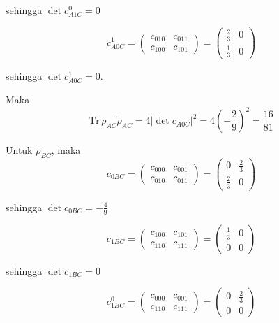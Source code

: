 \begin{enumerate}
	sehingga $\det c_{A1C}^0 = 0$
	
	\begin{equation}
		c_{A0C}^1=
		\begin{pmatrix}
			c_{010} & c_{011} \\
			c_{100} & c_{101}
		\end{pmatrix}=
		\begin{pmatrix}
			\frac{2}{3} & 0 \\
			\frac{1}{3} & 0
		\end{pmatrix}
	\end{equation}
	
	sehingga $\det c_{A0C}^1 = 0$.
	
	Maka
	\begin{equation}
		\mathrm{Tr}\,\rho_{AC}\tilde{\rho}_{AC}=4|\det c_{A0C}|^2=4(-\frac{2}{9})^2=\frac{16}{81}
	\end{equation}
	
	Untuk $\rho_{BC}$, maka
	\begin{equation}
		c_{0BC}=
		\begin{pmatrix}
			c_{000} & c_{001} \\
			c_{010} & c_{011}
		\end{pmatrix}=
		\begin{pmatrix}
			0 & \frac{2}{3} \\
			\frac{2}{3} & 0
		\end{pmatrix}
	\end{equation}
	
	sehingga $\det c_{0BC} = -\frac{4}{9}$
	
	\begin{equation}
		c_{1BC}=
		\begin{pmatrix}
			c_{100} & c_{101} \\
			c_{110} & c_{111}
		\end{pmatrix}=
		\begin{pmatrix}
			\frac{1}{3} & 0 \\
			0 & 0
		\end{pmatrix}
	\end{equation}
	
	sehingga $\det c_{1BC} = 0$
	
	\begin{equation}
		c_{1BC}^0=
		\begin{pmatrix}
			c_{000} & c_{001} \\
			c_{110} & c_{111}
		\end{pmatrix}=
		\begin{pmatrix}
			0 & \frac{2}{3} \\
			0 & 0
		\end{pmatrix}
	\end{equation}
	

\end{enumerate}
